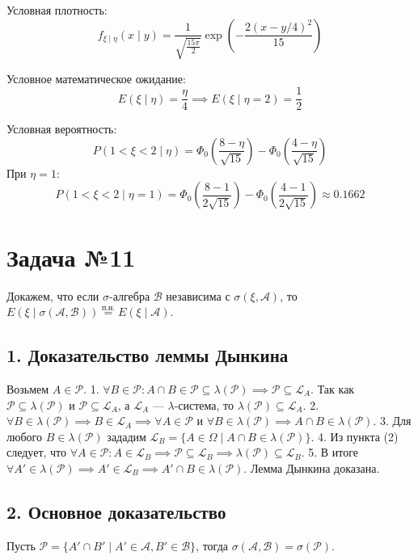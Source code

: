 \documentclass[12pt]{article}
\begin{document}
Условная плотность:
\[
f_{\xi \mid \eta}(x \mid y) = \frac{1}{\sqrt{\frac{15\pi}{2}}} \exp\left( -\frac{2 (x - y/4)^2}{15} \right)
\]

Условное математическое ожидание:
\[
E(\xi \mid \eta) = \frac{\eta}{4} \implies E(\xi \mid \eta = 2) = \frac{1}{2}
\]

Условная вероятность:
\[
P(1 < \xi < 2 \mid \eta) = \Phi_0\left( \frac{8 - \eta}{\sqrt{15}} \right) - \Phi_0\left( \frac{4 - \eta}{\sqrt{15}} \right)
\]
При $\eta = 1$:
\[
P(1 < \xi < 2 \mid \eta = 1) = \Phi_0\left( \frac{8 - 1}{2\sqrt{15}} \right) - \Phi_0\left( \frac{4 - 1}{2\sqrt{15}} \right) \approx 0.1662
\]

\bigskip
\section*{Задача №11}

Докажем, что если $\sigma$-алгебра $\mathcal{B}$ независима с $\sigma(\xi, \mathcal{A})$, то $E(\xi \mid \sigma(\mathcal{A}, \mathcal{B})) \stackrel{\text{п.н.}}{=} E(\xi \mid \mathcal{A})$.

\subsection*{1. Доказательство леммы Дынкина}
Возьмем $A \in \mathcal{P}$. 
1. $\forall B \in \mathcal{P} : A \cap B \in \mathcal{P} \subseteq \lambda(\mathcal{P}) \implies \mathcal{P} \subseteq \mathcal{L}_A$. Так как $\mathcal{P} \subseteq \lambda(\mathcal{P})$ и $\mathcal{P} \subseteq \mathcal{L}_A$, а $\mathcal{L}_A$ — $\lambda$-система, то $\lambda(\mathcal{P}) \subseteq \mathcal{L}_A$.
2. $\forall B \in \lambda(\mathcal{P}) \implies B \in \mathcal{L}_A \implies \forall A \in \mathcal{P} \text{ и } \forall B \in \lambda(\mathcal{P}) \implies A \cap B \in \lambda(\mathcal{P})$.
3. Для любого $B \in \lambda(\mathcal{P})$ зададим $\mathcal{L}_B = \{ A \in \Omega \mid A \cap B \in \lambda(\mathcal{P}) \}$.
4. Из пункта (2) следует, что $\forall A \in \mathcal{P} : A \in \mathcal{L}_B \implies \mathcal{P} \subseteq \mathcal{L}_B \implies \lambda(\mathcal{P}) \subseteq \mathcal{L}_B$.
5. В итоге $\forall A' \in \lambda(\mathcal{P}) \implies A' \in \mathcal{L}_B \implies A' \cap B \in \lambda(\mathcal{P})$. Лемма Дынкина доказана.

\subsection*{2. Основное доказательство}
Пусть $\mathcal{P} = \{ A' \cap B' \mid A' \in \mathcal{A}, B' \in \mathcal{B} \}$, тогда $\sigma(\mathcal{A}, \mathcal{B}) = \sigma(\mathcal{P})$.
\end{document}
